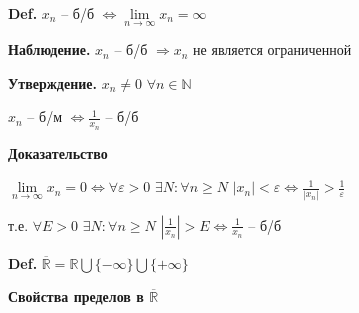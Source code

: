\documentclass[14pt, letter paper]{article}
\begin{document}
\textbf{Def.} $x_n$ -- б/б $\Leftrightarrow \lim\limits_{n \rightarrow \infty}{x_n} = \infty$

\textbf{Наблюдение.} $x_n$ -- б/б $\Rightarrow x_n$ не является ограниченной

\textbf{Утверждение.} $x_n \neq 0$ $\forall n \in \mathds{N}$

$x_n$ -- б/м $\Leftrightarrow \frac{1}{x_n}$ -- б/б

\begin{center}
    \textbf{Доказательство}
\end{center}

$\lim\limits_{n \rightarrow \infty}{x_n} = 0 \Leftrightarrow \forall \varepsilon > 0$ $\exists N : \forall n \geq N$ $|x_n| < \varepsilon \Leftrightarrow \frac{1}{|x_n|} > \frac{1}{\varepsilon}$

т.е. $\forall E > 0$ $\exists N : \forall n \geq N$ $|\frac{1}{x_n}| > E \Leftrightarrow \frac{1}{x_n}$ -- б/б

\textbf{Def.} $\overline{\mathds{R}} = \mathds{R} \bigcup \{-\infty\} \bigcup \{+\infty\}$

\textbf{Свойства пределов в $\overline{\mathds{R}}$}
\end{document}
